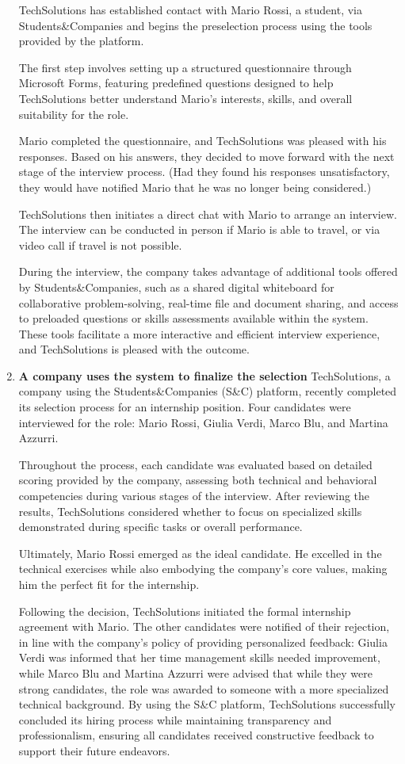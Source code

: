 \begin{enumerate}
    TechSolutions has established contact with Mario Rossi, a student, via Students\&Companies and begins the preselection process using the tools provided by the platform.

    The first step involves setting up a structured questionnaire through Microsoft Forms, featuring predefined questions designed to help TechSolutions better understand Mario’s interests, skills, and overall suitability for the role.

    Mario completed the questionnaire, and TechSolutions was pleased with his responses. Based on his answers, they decided to move forward with the next stage of the interview process. (Had they found his responses unsatisfactory, they would have notified Mario that he was no longer being considered.)

    TechSolutions then initiates a direct chat with Mario to arrange an interview. The interview can be conducted in person if Mario is able to travel, or via video call if travel is not possible.

    During the interview, the company takes advantage of additional tools offered by Students\&Companies, such as a shared digital whiteboard for collaborative problem-solving, real-time file and document sharing, and access to preloaded questions or skills assessments available within the system. These tools facilitate a more interactive and efficient interview experience, and TechSolutions is pleased with the outcome.

    \item \textbf{A company uses the system to finalize the selection}
    TechSolutions, a company using the Students\&Companies (S\&C) platform, recently completed its selection process for an internship position. Four candidates were interviewed for the role: Mario Rossi, Giulia Verdi, Marco Blu, and Martina Azzurri.

    Throughout the process, each candidate was evaluated based on detailed scoring provided by the company, assessing both technical and behavioral competencies during various stages of the interview. After reviewing the results, TechSolutions considered whether to focus on specialized skills demonstrated during specific tasks or overall performance.

    Ultimately, Mario Rossi emerged as the ideal candidate. He excelled in the technical exercises while also embodying the company's core values, making him the perfect fit for the internship.

    Following the decision, TechSolutions initiated the formal internship agreement with Mario. The other candidates were notified of their rejection, in line with the company's policy of providing personalized feedback: Giulia Verdi was informed that her time management skills needed improvement, while Marco Blu and Martina Azzurri were advised that while they were strong candidates, the role was awarded to someone with a more specialized technical background.
    By using the S\&C platform, TechSolutions successfully concluded its hiring process while maintaining transparency and professionalism, ensuring all candidates received constructive feedback to support their future endeavors.
    


\end{enumerate}
